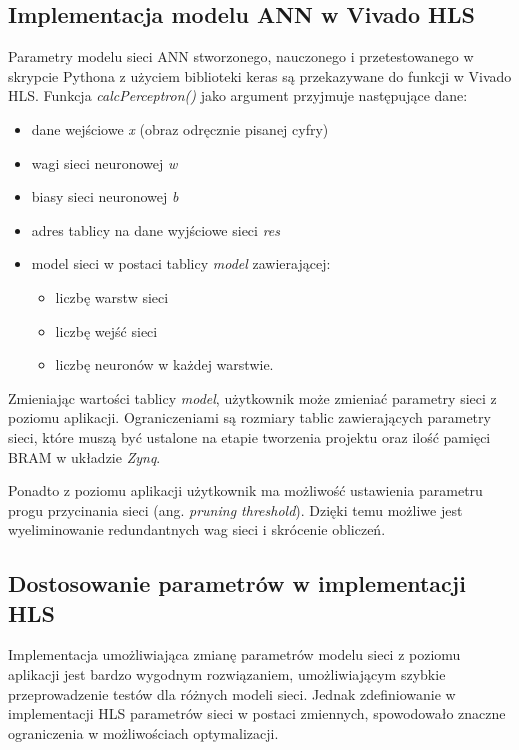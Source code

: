 \subsection{Implementacja modelu ANN w Vivado HLS}
  Parametry modelu sieci ANN stworzonego, nauczonego i przetestowanego w skrypcie Pythona z użyciem biblioteki keras są przekazywane do funkcji w Vivado HLS. Funkcja \emph{calcPerceptron()} jako argument przyjmuje następujące dane:
  \begin{itemize}
    \item dane wejściowe \emph{x} (obraz odręcznie pisanej cyfry)
    \item wagi sieci neuronowej \emph{w}
    \item biasy sieci neuronowej \emph{b}
    \item adres tablicy na dane wyjściowe sieci \emph{res}
    \item model sieci w postaci tablicy \emph{model} zawierającej:
    \begin{itemize}
      \item liczbę warstw sieci
      \item liczbę wejść sieci
      \item liczbę neuronów w każdej warstwie.
    \end{itemize}
  \end{itemize}

  Zmieniając wartości tablicy \emph{model}, użytkownik może zmieniać parametry sieci z poziomu aplikacji. Ograniczeniami są rozmiary tablic zawierających parametry sieci, które muszą być ustalone na etapie tworzenia projektu oraz ilość pamięci BRAM w układzie \emph{Zynq}.
   
Ponadto z poziomu aplikacji użytkownik ma możliwość ustawienia parametru progu przycinania sieci (ang. \emph{pruning threshold}). Dzięki temu możliwe jest wyeliminowanie redundantnych wag sieci i skrócenie obliczeń.

\subsection{Dostosowanie parametrów w implementacji HLS}

Implementacja umożliwiająca zmianę parametrów modelu sieci z poziomu aplikacji jest bardzo wygodnym rozwiązaniem, 
umożliwiającym szybkie przeprowadzenie testów dla różnych modeli sieci. Jednak zdefiniowanie w implementacji HLS parametrów 
sieci w postaci zmiennych, spowodowało znaczne ograniczenia w możliwościach optymalizacji. 

